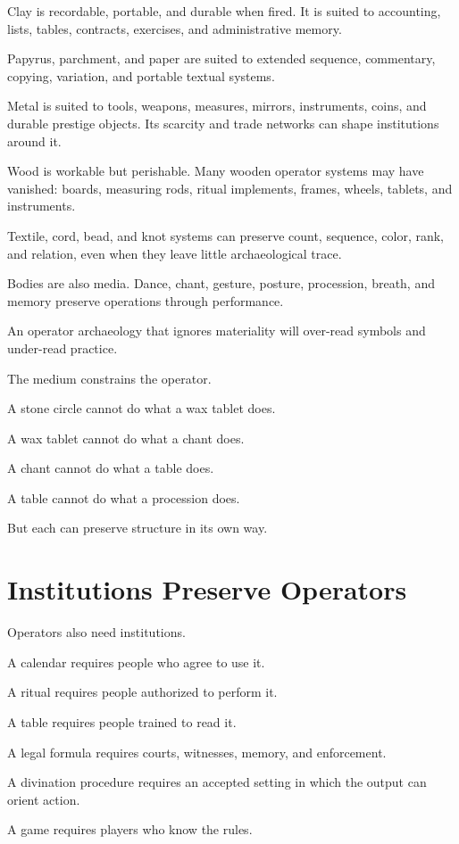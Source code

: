 \documentclass[11pt]{book}
\begin{document}
Clay is recordable, portable, and durable when fired. It is suited to accounting, lists, tables, contracts, exercises, and administrative memory.

Papyrus, parchment, and paper are suited to extended sequence, commentary, copying, variation, and portable textual systems.

Metal is suited to tools, weapons, measures, mirrors, instruments, coins, and durable prestige objects. Its scarcity and trade networks can shape institutions around it.

Wood is workable but perishable. Many wooden operator systems may have vanished: boards, measuring rods, ritual implements, frames, wheels, tablets, and instruments.

Textile, cord, bead, and knot systems can preserve count, sequence, color, rank, and relation, even when they leave little archaeological trace.

Bodies are also media. Dance, chant, gesture, posture, procession, breath, and memory preserve operations through performance.

An operator archaeology that ignores materiality will over-read symbols and under-read practice.

The medium constrains the operator.

A stone circle cannot do what a wax tablet does.

A wax tablet cannot do what a chant does.

A chant cannot do what a table does.

A table cannot do what a procession does.

But each can preserve structure in its own way.

\section{Institutions Preserve Operators}

Operators also need institutions.

A calendar requires people who agree to use it.

A ritual requires people authorized to perform it.

A table requires people trained to read it.

A legal formula requires courts, witnesses, memory, and enforcement.

A divination procedure requires an accepted setting in which the output can orient action.

A game requires players who know the rules.
\end{document}
